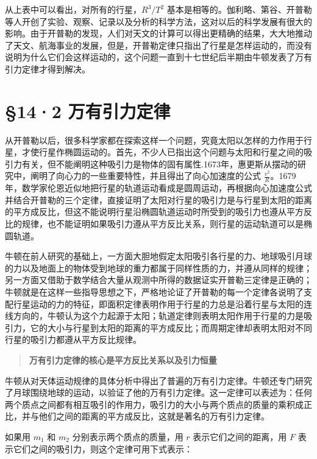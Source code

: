 从上表中可以看出，对所有的行星，\(R^{3}/T^{2}\)
基本是相等的。伽利略、第谷、开普勒等人开创了实验、观察、记录以及分析的科学方法，这对以后的科学发展有很大的影响。由于开普勒的发现，人们对天文的计算可以得出更精确的结果，大大地推动了天文、航海事业的发展，但是，开普勒定律只指出了行星是怎样运动的，而没有说明为什么它们会这样运动的，这个问题一直到十七世纪后半期由牛顿发表了万有引力定律才得到解决。

\section{§14·2 万有引力定律}\label{ux4e07ux6709ux5f15ux529bux5b9aux5f8b}

从开普勒以后，很多科学家都在探索这样一个问题，究竟太阳以怎样的力作用于行星，才使行星作椭圆运动的。首先，不少人已指出这个问题与太阳和行星之间的吸引力有关，但不能阐明这种吸引力是物体的固有属性.1673年，惠更斯从摆动的研究中，阐明了向心力的一些重要特性，并且得出了向心加速度的公式
\(\frac{v^2}{R}\)。1679年，数学家伦恩近似地把行星的轨道运动看成是圆周运动，再根据向心加速度公式并结合开普勒的三个定律，直接证明了太阳对行星的吸引力是与行星到太阳的距离的平方成反比，但这不能说明行星沿椭圆轨道运动时所受到的吸引力也遵从平方反比的规律，也不能证明如果吸引力遵从平方反比关系，则行星的运动轨道可以是椭圆轨道。

牛顿在前人研究的基础上，一方面大胆地假定太阳吸引各行星的力、地球吸引月球的力以及地面上的物体受到地球的重力都属于同样性质的力，并遵从同样的规律；另一方面又借助于数学结合大量从观测中所得的数据证实开普勒三定律是正确的；牛顿就是在这样一些指导思想之下，严格地论证了开普勒的每一个定律各说明了支配行星运动的力的特征，即面积定律表明作用于行星的力总是沿着行星与太阳的连线方向的，牛顿认为这个力起源于太阳；轨道定律则表明太阳作用于行星的力是吸引力，它的大小与行星到太阳的距离的平方成反比；而周期定律却表明太阳对不同行星的吸引力都遵从平方反比规律。

\begin{quote}
\textbf{万有引力定律的核心是平方反比关系以及引力恒量}
\end{quote}

牛顿从对天体运动规律的具体分析中得出了普遍的万有引力定律。牛顿还专门研究了月球围绕地球的运动，以验证了他的万有引力定律。这一定律可以表述为：任何两个质点之间都有相互吸引的作用力，吸引力的大小与两个质点的质量的乘积成正比，并与他们之间的距离的平方成反比，这就是著名的万有引力定律。

如果用 \(m_{1}\) 和 \(m_{2}\) 分别表示两个质点的质量，用 \(r\)
表示它们之间的距离，用 \(F\)
表示它们之间的吸引力，则这个定律可用下式表示：

